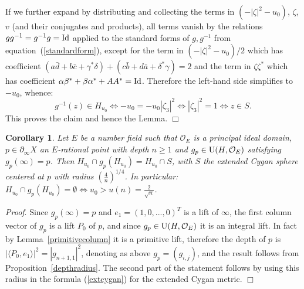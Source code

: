 \documentclass{article}[12pt]
\newtheorem{cor}{Corollary}
\newcommand{\Pf}{{\em Proof}. }
\newcommand{\EPf}{\hfill$\Box$\vspace{.5cm}}
\begin{document}
If we further expand by distributing and collecting the terms in $(-|\zeta|^2-u_0)$, $\zeta$, $v$ (and their conjugates and products), all terms vanish by the relations $gg^{-1}=g^{-1}g={\rm Id}$ applied to the standard forms of $g,g^{-1}$ from equation~(\ref{standardform}),
except for the term in $(-|\zeta|^2-u_0)/2$ which has coefficient $(a\bar{d}+b\bar{c}+\gamma^* \delta)+(c\bar{b}+d\bar{a}+\delta^*\gamma)=2$
and the term in $\zeta\zeta^*$ which has coefficient $\alpha\beta^*+\beta\alpha^*+AA^*={\rm Id}$. 
Therefore the left-hand side simplifies to $-u_0$, whence:
 $$g^{-1}(z) \in H_{u_0} \iff -u_0=-u_0|\zeta_3|^2 \iff |\zeta_3|^2=1 \iff z \in S.$$ 
 This proves the claim and hence the Lemma. \EPf

\begin{cor}\label{cordepthradius} Let $E$ be a number field such that $\mathcal{O}_E$ is a principal ideal domain, $p \in \partial_\infty X$ an $E$-rational point with depth $n \geqslant 1$ and $g_p \in {\rm U}(H,\mathcal{O}_E)$ satisfying $g_p(\infty)=p$. Then $H_{u_0} \cap g_p(H_{u_0})=H_{u_0} \cap S$, with $S$  the extended Cygan sphere centered at $p$ with radius $\left(\frac{4}{n}\right)^{1/4}$. In particular: 
$H_{u_0} \cap g_p(H_{u_0})=\emptyset \iff u_0>u(n)=\frac{2}{\sqrt{n}}$.
\end{cor}

\Pf Since $g_p(\infty)=p$ and $e_1=(1,0,...,0)^T$ is a lift of $\infty$, the first column vector of $g_p$ is a lift $P_0$ of $p$, and since $g_p \in {\rm U}(H,\mathcal{O}_E)$ it is an integral lift. In fact by Lemma~\ref{primitivecolumn} it is a primitive lift, therefore the depth of $p$ is $|\langle P_0,e_1\rangle|^2=|g_{n+1,1}|^2$, denoting as above $g_p=(g_{i,j})$, and the result follows from Proposition~\ref{depthradius}. The second part of the statement follows by using this radius in the formula (\ref{extcygan}) for the extended Cygan metric. \EPf
\end{document}
